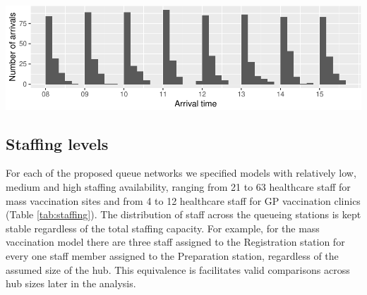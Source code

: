 \documentclass{article}
\let\origfigure\figure
\let\endorigfigure\endfigure
\renewenvironment{figure}[1][2] {
    \expandafter\origfigure\expandafter[H]
} {
    \endorigfigure
}
\begin{document}
\begin{figure}

{\centering \includegraphics{Preprint_files/figure-latex/arrivalTimes-1} 

}

\caption{Randomly generated arrival times for a mass vaccination hub (A) and a GP vaccination clinic (B)}\label{fig:arrivalTimes}
\end{figure}

\hypertarget{staffing-levels}{%
\subsection{Staffing levels}\label{staffing-levels}}

For each of the proposed queue networks we specified models with
relatively low, medium and high staffing availability, ranging from 21
to 63 healthcare staff for mass vaccination sites and from 4 to 12
healthcare staff for GP vaccination clinics (Table \ref{tab:staffing}).
The distribution of staff across the queueing stations is kept stable
regardless of the total staffing capacity. For example, for the mass
vaccination model there are three staff assigned to the Registration
station for every one staff member assigned to the Preparation station,
regardless of the assumed size of the hub. This equivalence is
facilitates valid comparisons across hub sizes later in the analysis.
\end{document}
